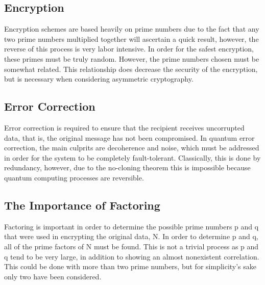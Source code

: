 \documentclass[a4paper,11pt]{article}
\theoremstyle{mytheor}
\begin{document}
\subsection{Encryption}
\cite{C5}\cite{QLect}\cite{Im}\cite{QCQI}
Encryption schemes are based heavily on prime numbers due to the fact that any two prime numbers multiplied together will ascertain a quick result, however, the reverse of this process is very labor intensive.  In order for the safest encryption, these primes must be truly random.  However, the prime numbers chosen must be somewhat related.  This relationship does decrease the security of the encryption, but is necessary when considering asymmetric cryptography.

\subsection{Error Correction}
\cite{C5}\cite{QLect}\cite{QCQI}\cite{Clone}
Error correction is required to ensure that the recipient receives uncorrupted data, that is, the original message has not been compromised.  In quantum error correction, the main culprits are decoherence and noise, which must be addressed in order for the system to be completely  fault-tolerant.  Classically, this is done by redundancy, however, due to the no-cloning theorem \cite{Clone} this is impossible because quantum computing processes are reversible. 


\subsection{The Importance of Factoring}
\cite{C5}\cite{QLect}
Factoring is important in order to determine the possible prime numbers p and q that were used in encrypting the original data, N.  In order to determine p and q, all of the prime factors of N must be found.  This is not a trivial process as p and q tend to be very large, in addition to showing an almost nonexistent correlation.  This could be done with more than two prime numbers, but for simplicity’s sake only two have been considered.  
\end{document}

